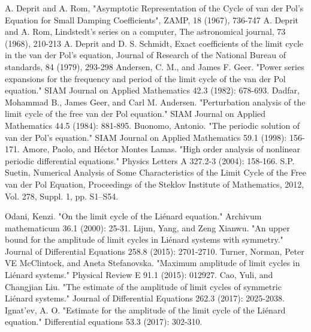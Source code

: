 \documentclass[final]{article}
\begin{document}
\begin{thebibliography}{}
	
 A. Deprit and A. Rom, "Asymptotic Representation of the Cycle of van der Pol's Equation for Small Damping Coefficients", ZAMP, 18 (1967), 736-747
 A. Deprit and A. Rom, Lindstedt's series on a computer, The astronomical journal, 73 (1968), 210-213
 A. Deprit and D. S. Schmidt, Exact coefficients of the limit cycle in the van der Pol's equation, Journal of Research of the National Bureau of standards, 84 (1979), 293-298
 Andersen, C. M., and James F. Geer. "Power series expansions for the frequency and period of the limit cycle of the van der Pol equation." SIAM Journal on Applied Mathematics 42.3 (1982): 678-693.
 Dadfar, Mohammad B., James Geer, and Carl M. Andersen. "Perturbation analysis of the limit cycle of the free van der Pol equation." SIAM Journal on Applied Mathematics 44.5 (1984): 881-895.
 Buonomo, Antonio. "The periodic solution of van der Pol's equation." SIAM Journal on Applied Mathematics 59.1 (1998): 156-171.
 Amore, Paolo, and Héctor Montes Lamas. "High order analysis of nonlinear periodic differential equations." Physics Letters A 327.2-3 (2004): 158-166.
 S.P. Suetin, Numerical Analysis of Some Characteristics of the Limit Cycle of the Free van der Pol Equation, Proceedings of the Steklov Institute of Mathematics, 2012, Vol. 278, Suppl. 1, pp. S1–S54.
	
	
	
 Odani, Kenzi. "On the limit cycle of the Liénard equation." Archivum mathematicum 36.1 (2000): 25-31.
 Lijun, Yang, and Zeng Xianwu. "An upper bound for the amplitude of limit cycles in Liénard systems with symmetry." Journal of Differential Equations 258.8 (2015): 2701-2710.
 Turner, Norman, Peter VE McClintock, and Aneta Stefanovska. "Maximum amplitude of limit cycles in Liénard systems." Physical Review E 91.1 (2015): 012927.
 Cao, Yuli, and Changjian Liu. "The estimate of the amplitude of limit cycles of symmetric Liénard systems." Journal of Differential Equations 262.3 (2017): 2025-2038.
 Ignat’ev, A. O. "Estimate for the amplitude of the limit cycle of the Liénard equation." Differential equations 53.3 (2017): 302-310.
	

\end{thebibliography}
\end{document}
